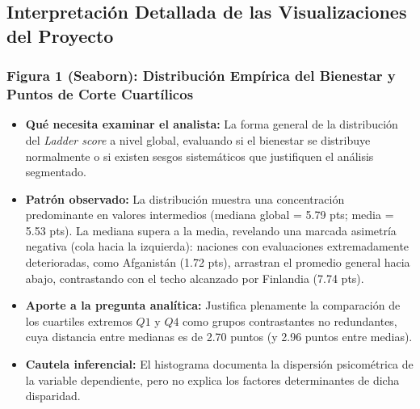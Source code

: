 \documentclass[11pt]{article}
\begin{document}
\subsection{Interpretación Detallada de las Visualizaciones del Proyecto}

\subsubsection{Figura 1 (Seaborn): Distribución Empírica del Bienestar y Puntos de Corte Cuartílicos}
\begin{itemize}
    \item \textbf{Qué necesita examinar el analista:} La forma general de la distribución del \textit{Ladder score} a nivel global, evaluando si el bienestar se distribuye normalmente o si existen sesgos sistemáticos que justifiquen el análisis segmentado.
    \item \textbf{Patrón observado:} La distribución muestra una concentración predominante en valores intermedios (mediana global = 5.79 pts; media = 5.53 pts). La mediana supera a la media, revelando una marcada asimetría negativa (cola hacia la izquierda): naciones con evaluaciones extremadamente deterioradas, como Afganistán (1.72 pts), arrastran el promedio general hacia abajo, contrastando con el techo alcanzado por Finlandia (7.74 pts).
    \item \textbf{Aporte a la pregunta analítica:} Justifica plenamente la comparación de los cuartiles extremos $Q1$ y $Q4$ como grupos contrastantes no redundantes, cuya distancia entre medianas es de 2.70 puntos (y 2.96 puntos entre medias).
    \item \textbf{Cautela inferencial:} El histograma documenta la dispersión psicométrica de la variable dependiente, pero no explica los factores determinantes de dicha disparidad.
\end{itemize}
\end{document}
